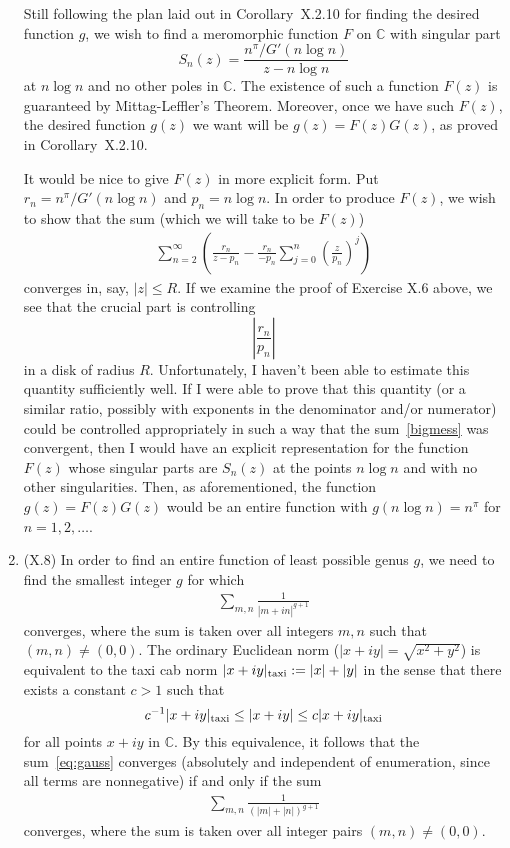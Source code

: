 \documentclass[11pt]{book}
\theoremstyle{definition}
\newcommand{\taxi}[1]{| #1 |_{\textup{taxi}}}
\begin{document}
\begin{enumerate}
    Still following the plan laid out in Corollary~X.2.10 for finding the desired function $g$, we wish to find a meromorphic function $F$ on $\mathbb C$ with singular part 
    \[ S_n(z) = \frac{n^\pi / G'(n\log n)}{z - n\log n} \] at $n\log n$ and no other poles in $\mathbb C$.   The existence of such a function $F(z)$ is guaranteed by Mittag-Leffler's Theorem.  Moreover, once we have such $F(z)$, the desired function $g(z)$ we want will be $g(z) = F(z) G(z)$, as proved in Corollary~X.2.10.  
    
    It would be nice to give $F(z)$ in more explicit form.  Put $r_n = n^\pi / G'(n\log n)$ and $p_n = n\log n$.  In order to produce $F(z)$, we wish to show that the sum (which we will take to be $F(z)$)
    \begin{align}
      \sum_{n=2}^\infty \left( \frac{r_n}{z - p_n} - \frac{r_n}{-p_n} \sum_{j=0}^n \left( \frac{z}{p_n} \right)^j \right) \label{bigmess}
    \end{align} converges in, say, $|z|\leq R$.  If we examine the proof of Exercise X.6 above, we see that the crucial part is controlling 
    \[ \left| \frac{r_n}{p_n} \right| \] in a disk of radius $R$.  Unfortunately, I haven't been able to estimate this quantity sufficiently well.  If I were able to prove that this quantity (or a similar ratio, possibly with exponents in the denominator and/or numerator) could be controlled appropriately in such a way that the sum~\eqref{bigmess} was convergent, then I would have an explicit representation for the function $F(z)$ whose singular parts are $S_n(z)$ at the points $n\log n$ and with no other singularities.  Then, as aforementioned, the function $g(z) = F(z)G(z)$ would be an entire function with $g(n\log n) = n^\pi$ for $n=1,2,\ldots$.  

  \item (X.8)  In order to find an entire function of least possible genus $g$, we need to find the smallest integer $g$ for which 
    \begin{align}
      \sum_{m, n} \frac{1}{|m+in|^{g+1}} 
      \label{eq:gauss}
    \end{align} converges, where the sum is taken over all integers $m,n$ such that $(m,n) \neq (0,0)$.   The ordinary Euclidean norm ($|x+iy| = \sqrt{x^2+y^2}$) is equivalent to the taxi cab norm $\taxi{x+iy} := |x| + |y|$ in the sense that there exists a constant $c>1$ such that  
    \[ c^{-1} \taxi{x+iy} \leq |x+iy| \leq c\taxi{x+iy} \] for all points $x+iy$ in $\mathbb C$.  By this equivalence, it follows that the sum~\eqref{eq:gauss} converges (absolutely and independent of enumeration, since all terms are nonnegative) if and only if the sum 
    \begin{align}
      \sum_{m,n} \frac{1}{(|m| + |n|)^{g+1}} 
      \label{eq:taxi}
    \end{align} converges, where the sum is taken over all integer pairs $(m,n) \neq (0,0)$.


\end{enumerate}
\end{document}
